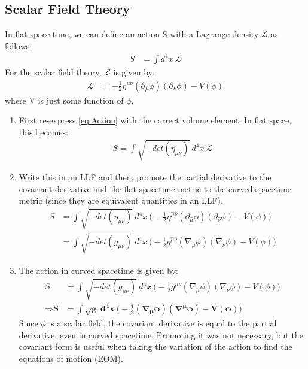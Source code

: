 \documentclass[10pt]{article}
\begin{document}
            \subsection{Scalar Field Theory}
                In flat space time, we can define an action S with a Lagrange density $\mathcal{L}$ as follows:
                    \begin{align}\label{eq:Action}
                        S &= \int d^{4}x \ \mathcal{L}
                    \end{align}
                For the scalar field theory, $\mathcal{L}$ is given by: 
                    \begin{align}\label{eq:Lagrangian}
                        \mathcal{L} &= - \frac{1}{2} \eta^{\mu \nu} (\partial_{\mu}\phi) (\partial_{\nu}\phi) - V(\phi)
                    \end{align}
                where V is just some function of $\phi$.
                \begin{enumerate}
                    \item First re-express \eqref{eq:Action} with the correct volume element. In flat space, this becomes: 
                    \begin{align}\label{eq:CorrectAction}
                        S =  \int \sqrt{-det(\eta_{\mu \nu})} \ d^{4}x \ \mathcal{L}
                    \end{align}
                    \item Write this in an LLF and then, promote the partial derivative to the covariant derivative and the flat spacetime metric to the curved spacetime metric (since they are equivalent quantities in an LLF).
                    \begin{align}
                        S &=  \int \sqrt{-det(\eta_{\hat{\mu} \hat{\nu}})} \ d^{4}x \  \Big( -\frac{1}{2} \eta^{\hat{\mu} \hat{\nu}} (\partial_{\hat{\mu}}\phi) (\partial_{\hat{\nu}}\phi) - V(\phi) \Big) \\
                        &= \int \sqrt{-det(g_{\hat{\mu} \hat{\nu}})} \ d^{4}x \ \Big( -\frac{1}{2} g^{\hat{\mu} \hat{\nu}} (\nabla_{\hat{\mu}}\phi) (\nabla_{\hat{\nu}}\phi) - V(\phi) \Big)
                    \end{align}
                    \item The action in curved spacetime is given by:
                        \begin{align}
                            S &= \int \sqrt{-det(g_{\mu \nu})} \ d^{4}x \ \Big( - \frac{1}{2}g^{\mu \nu}(\nabla_{\mu}\phi) (\nabla_{\nu}\phi) - V(\phi) \Big) \\
                         \Rightarrow \textbf{S} &\boldsymbol{= \int \sqrt{g} \ d^{4}x \ \Big( - \frac{1}{2} (\nabla_{\mu}\phi) (\nabla^{\mu}\phi) - V(\phi) \Big)}
                        \end{align}
                         Since $\phi$ is a scalar field, the covariant derivative is equal to the partial derivative, even in curved spacetime. Promoting it was not necessary, but the covariant form is useful when taking the variation of the action to find the equations of motion (EOM).
                \end{enumerate}
\end{document}

